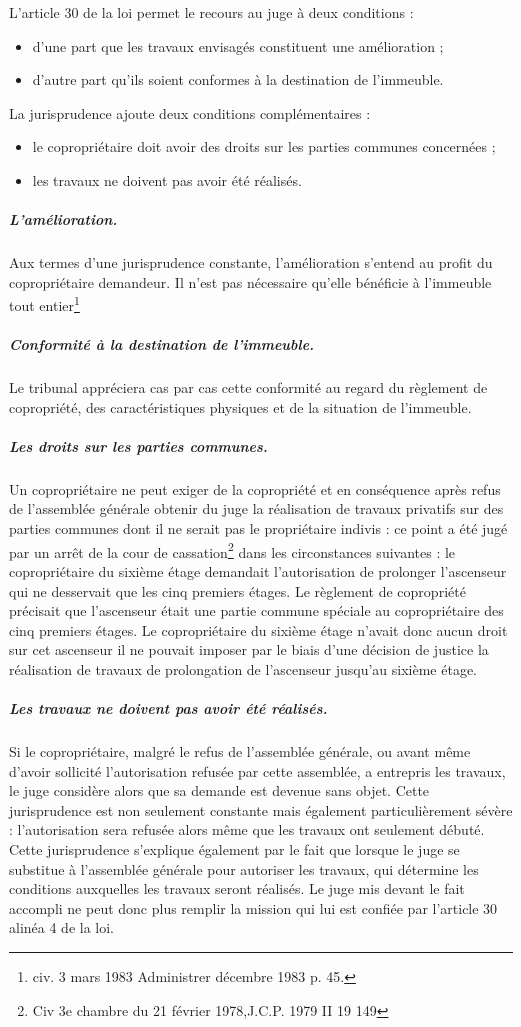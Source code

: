 				L'article 30 de la loi permet le recours au juge à deux conditions :
				\begin{itemize}
					\item d'une part que les travaux envisagés constituent une amélioration ;
					\item d'autre part qu'ils soient conformes à la destination de l'immeuble.
				\end{itemize}
				
				La jurisprudence ajoute deux conditions complémentaires :
				\begin{itemize}
					\item le copropriétaire doit avoir des droits sur les parties communes concernées ;
					\item les travaux ne doivent pas avoir été réalisés.
				\end{itemize}
				
				\subparagraph{L'amélioration.}
				Aux termes d'une jurisprudence constante, l'amélioration s'entend au profit du copropriétaire demandeur. Il n'est pas nécessaire qu'elle bénéficie à l'immeuble tout entier\footnote{ civ. 3 mars 1983 Administrer décembre 1983 p. 45.}
				
				\subparagraph{Conformité à la destination de l'immeuble.}
				Le tribunal appréciera cas par cas cette conformité au regard du règlement de copropriété, des caractéristiques physiques et de la situation de l'immeuble.
				
				\subparagraph{Les droits sur les parties communes.}
				Un copropriétaire ne peut exiger de la copropriété et en conséquence après refus de l'assemblée générale obtenir du juge la réalisation de travaux privatifs sur des parties communes dont il ne serait pas le propriétaire indivis : ce point a été jugé par un arrêt de la cour de cassation\footnote{Civ 3e chambre du 21 février 1978,J.C.P. 1979 II 19 149} dans les circonstances suivantes : le copropriétaire du sixième étage
				demandait l'autorisation de prolonger l'ascenseur qui ne desservait que les cinq premiers étages. Le règlement de copropriété précisait que l'ascenseur était une partie commune spéciale au copropriétaire des cinq premiers étages. Le copropriétaire du sixième étage n'avait donc aucun droit sur cet ascenseur il ne pouvait imposer par le biais d'une décision de justice la réalisation de travaux de prolongation de l'ascenseur jusqu'au sixième étage.
				
				\subparagraph{Les travaux ne doivent pas avoir été réalisés.}
				Si le copropriétaire, malgré le refus de l'assemblée générale, ou avant même d'avoir sollicité l'autorisation refusée par cette assemblée, a entrepris les travaux, le juge considère alors que sa demande est devenue sans objet. Cette jurisprudence est non seulement constante mais également particulièrement sévère : l'autorisation sera refusée alors même que les travaux ont seulement débuté.
				Cette jurisprudence s'explique également par le fait que lorsque le juge se substitue à l'assemblée générale pour autoriser les travaux, qui détermine les conditions auxquelles les travaux seront réalisés. Le juge mis devant le fait accompli ne peut donc plus remplir la mission qui lui est confiée par l'article 30 alinéa 4 de la loi.
				
